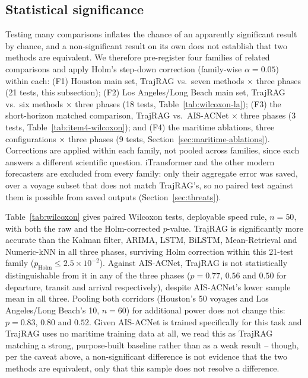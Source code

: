 \subsection{Statistical significance}
\label{sec:significance}

Testing many comparisons inflates the chance of an apparently significant
result by chance, and a non-significant result on its own does not
establish that two methods are equivalent. We therefore pre-register four
families of related comparisons and apply Holm's step-down correction
(family-wise $\alpha = 0.05$) within each: (F1) Houston main set, TrajRAG
vs.\ seven methods $\times$ three phases (21 tests, this subsection); (F2)
Los Angeles/Long Beach main set, TrajRAG vs.\ six methods $\times$ three
phases (18 tests, Table~\ref{tab:wilcoxon-la}); (F3) the short-horizon
matched comparison, TrajRAG vs.\ AIS-ACNet $\times$ three phases (3 tests,
Table~\ref{tab:item4-wilcoxon}); and (F4) the maritime ablations, three
configurations $\times$ three phases (9 tests,
Section~\ref{sec:maritime-ablations}). Corrections are applied within each
family, not pooled across families, since each answers a different
scientific question. iTransformer and the other modern forecasters are
excluded from every family: only their aggregate error was saved, over a
voyage subset that does not match TrajRAG's, so no paired test against them
is possible from saved outputs (Section~\ref{sec:threats}).

Table~\ref{tab:wilcoxon} gives paired Wilcoxon tests, deployable speed rule,
$n=50$, with both the raw and the Holm-corrected $p$-value. TrajRAG is
significantly more accurate than the Kalman filter, ARIMA, LSTM, BiLSTM,
Mean-Retrieval and Numeric-kNN in all three phases, surviving Holm
correction within this 21-test family ($p_{\text{Holm}} \leq 2.5 \times
10^{-2}$). Against AIS-ACNet, TrajRAG is not statistically distinguishable
from it in any of the three phases ($p = 0.77$, $0.56$ and $0.50$ for
departure, transit and arrival respectively), despite AIS-ACNet's lower
sample mean in all three. Pooling both corridors (Houston's 50 voyages and
Los Angeles/Long Beach's 10, $n=60$) for additional power does not change
this: $p=0.83$, $0.80$ and $0.52$. Given AIS-ACNet is trained specifically
for this task and TrajRAG uses no maritime training data at all, we read
this as TrajRAG matching a strong, purpose-built baseline rather than as a
weak result -- though, per the caveat above, a non-significant difference
is not evidence that the two methods are equivalent, only that this sample
does not resolve a difference.

